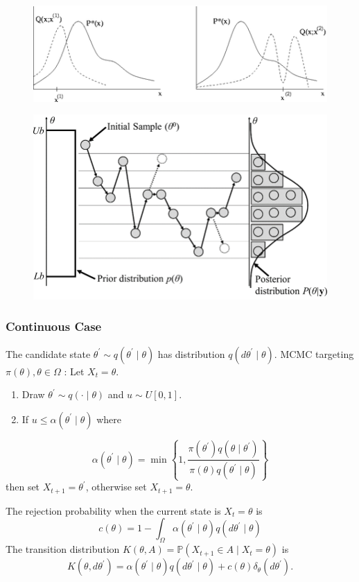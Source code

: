 \documentclass{article}
\begin{document}
\begin{figure}
    \centering
    \includegraphics[width=1\linewidth]{ox-hilary/bayes-methods/figures/450px-Metropolis_hastings_algorithm.png}
\end{figure}
\begin{figure}
    \centering
    \includegraphics[width=0.5\linewidth]{ox-hilary/bayes-methods/figures/flow.png}
\end{figure}
\subsubsection{Continuous Case}

The candidate state $\theta^{\prime} \sim q\left(\theta^{\prime} \mid \theta\right)$ has distribution $q\left(d \theta^{\prime} \mid \theta\right)$. MCMC targeting $\pi(\theta), \theta \in \Omega$ : Let $X_t=\theta$.
\begin{enumerate}
    \item Draw $\theta^{\prime} \sim q(\cdot \mid \theta)$ and $u \sim U[0,1]$.
    \item  If $u \leq \alpha\left(\theta^{\prime} \mid \theta\right)$ where
\end{enumerate}
 
$$
\alpha\left(\theta^{\prime} \mid \theta\right)=\min \left\{1, \frac{\pi\left(\theta^{\prime}\right) q\left(\theta \mid \theta^{\prime}\right)}{\pi(\theta) q\left(\theta^{\prime} \mid \theta\right)}\right\}
$$
then set $X_{t+1}=\theta^{\prime}$, otherwise set $X_{t+1}=\theta$.

The rejection probability when the current state is $X_t=\theta$ is
$$
c(\theta)=1-\int_{\Omega} \alpha\left(\theta^{\prime} \mid \theta\right) q\left(d \theta^{\prime} \mid \theta\right)
$$
The transition distribution $ K(\theta, A)=\mathbb{P}\left(X_{t+1} \in A \mid X_t=\theta\right) $ is
$$
K\left(\theta, d \theta^{\prime}\right)=\alpha\left(\theta^{\prime} \mid \theta\right) q\left(d \theta^{\prime} \mid \theta\right)+c(\theta) \delta_\theta\left(d \theta^{\prime}\right) .
$$
\end{document}

